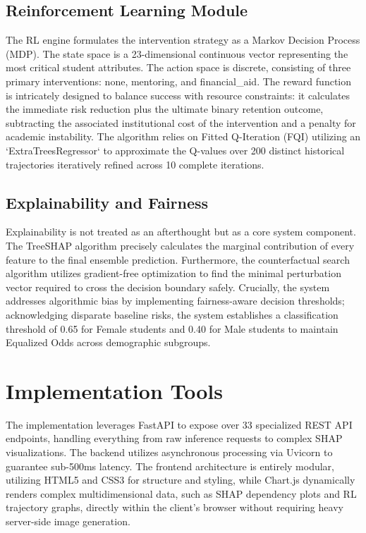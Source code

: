 \documentclass[12pt,a4paper]{report}
\begin{document}
\subsection{Reinforcement Learning Module}
The RL engine formulates the intervention strategy as a Markov Decision Process (MDP). The state space is a 23-dimensional continuous vector representing the most critical student attributes. The action space is discrete, consisting of three primary interventions: none, mentoring, and financial\_aid. The reward function is intricately designed to balance success with resource constraints: it calculates the immediate risk reduction plus the ultimate binary retention outcome, subtracting the associated institutional cost of the intervention and a penalty for academic instability. The algorithm relies on Fitted Q-Iteration (FQI) utilizing an `ExtraTreesRegressor` to approximate the Q-values over 200 distinct historical trajectories iteratively refined across 10 complete iterations.

\subsection{Explainability and Fairness}
Explainability is not treated as an afterthought but as a core system component. The TreeSHAP algorithm precisely calculates the marginal contribution of every feature to the final ensemble prediction. Furthermore, the counterfactual search algorithm utilizes gradient-free optimization to find the minimal perturbation vector required to cross the decision boundary safely. Crucially, the system addresses algorithmic bias by implementing fairness-aware decision thresholds; acknowledging disparate baseline risks, the system establishes a classification threshold of 0.65 for Female students and 0.40 for Male students to maintain Equalized Odds across demographic subgroups.

\section{Implementation Tools}
The implementation leverages FastAPI to expose over 33 specialized REST API endpoints, handling everything from raw inference requests to complex SHAP visualizations. The backend utilizes asynchronous processing via Uvicorn to guarantee sub-500ms latency. The frontend architecture is entirely modular, utilizing HTML5 and CSS3 for structure and styling, while Chart.js dynamically renders complex multidimensional data, such as SHAP dependency plots and RL trajectory graphs, directly within the client's browser without requiring heavy server-side image generation.
\end{document}
